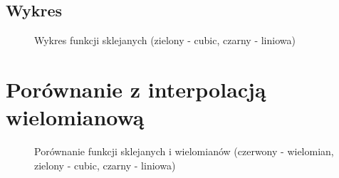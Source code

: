 \documentclass{article}
\begin{document}
    
    \subsection{Wykres}
    \begin{figure}[h]
        \caption{\label{fig:splines} Wykres funkcji sklejanych (zielony - cubic, czarny - liniowa)}
    \end{figure}

    \pagebreak
    
    \section{Porównanie z interpolacją wielomianową}
    \begin{figure}[h]
        \caption{\label{fig:splinesAndPolys} Porównanie funkcji sklejanych i wielomianów (czerwony - wielomian, zielony - cubic, czarny - liniowa)}
    \end{figure}
    
\end{document}
